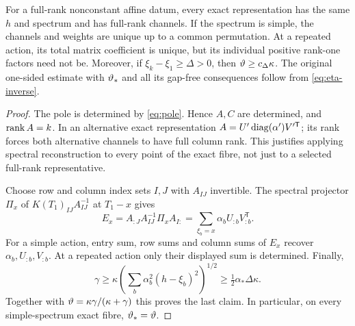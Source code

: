 \begin{proposition}
\label{prop:factors}
For a full-rank nonconstant affine datum, every exact representation
has the same $h$ and spectrum and has full-rank channels. If the
spectrum is simple, the channels and weights are unique up to a common
permutation. At a repeated action, its total matrix coefficient is
unique, but its individual positive rank-one factors need not be.
Moreover, if $\xi_k-\xi_1\ge\Delta>0$, then
$\vartheta\ge c_\Delta\kappa$. The original one-sided estimate with
$\vartheta_*$ and all its gap-free consequences follow from
\eqref{eq:eta-inverse}.
\end{proposition}
\begin{proof}
The pole is determined by \eqref{eq:pole}. Hence $A,C$ are determined,
and $\operatorname{rank} A=k$. In an alternative exact representation
$A=U'\operatorname{diag}(\alpha')V'^{\mathsf T}$; its rank forces both alternative
channels to have full column rank. This justifies applying spectral
reconstruction to every point of the exact fibre, not just to a
selected full-rank representative.

Choose row and column index sets $I,J$ with $A_{IJ}$ invertible.
The spectral projector $\Pi_x$ of
$K(T_1)_{IJ}A_{IJ}^{-1}$ at $T_1-x$ gives
\[
 E_x=A_{:J}A_{IJ}^{-1}\Pi_x A_{I:}
                =\sum_{\xi_b=x}\alpha_b U_{:b}V_{:b}^{\mathsf T}.
\]
For a simple action, entry sum, row sums and column sums of $E_x$
recover $\alpha_b,U_{:b},V_{:b}$. At a repeated action only their
displayed sum is determined. Finally,
\[
 \gamma\ge\kappa\left(\sum_b\alpha_b^2(h-\xi_b)^2\right)^{1/2}
                    \ge\tfrac12\alpha_*\Delta\kappa.
\]
Together with $\vartheta=\kappa\gamma/(\kappa+\gamma)$ this proves the
last claim. In particular, on every simple-spectrum exact fibre,
$\vartheta_* =\vartheta$.
\end{proof}
